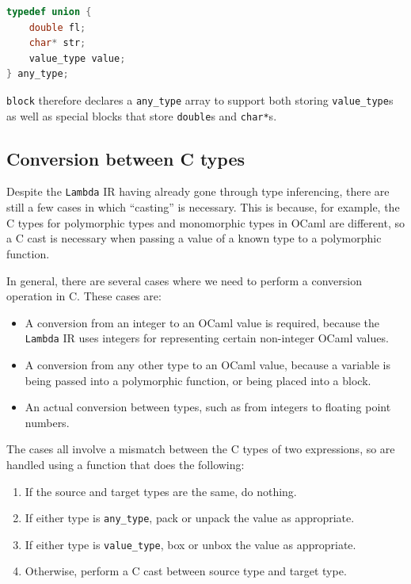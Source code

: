 \documentclass[12pt,a4paper,twoside,openright]{report}
\begin{document}
\begin{lstlisting}[language=C]
typedef union {
    double fl;
    char* str;
    value_type value;
} any_type;
\end{lstlisting}

\texttt{block} therefore declares a \verb|any_type| array to support both
storing \verb|value_type|s as well as special blocks that store \verb|double|s
and \verb|char*|s.

\subsection{Conversion between C types} \label{casting}

Despite the \texttt{Lambda} IR having already gone through type inferencing,
there are still a few cases in which ``casting'' is necessary. This is because,
for example, the C types for polymorphic types and monomorphic types in OCaml
are different, so a C cast is necessary when passing a value of a known type to
a polymorphic function.

In general, there are several cases where we need to perform a conversion
operation in C. These cases are: 

\begin{itemize}

\item A conversion from an integer to an OCaml value is required, because the
    \texttt{Lambda} IR uses integers for representing certain non-integer OCaml
    values.

\item A conversion from any other type to an OCaml value, because a variable is
    being passed into a polymorphic function, or being placed into a block.

\item An actual conversion between types, such as from integers to floating
    point numbers.

\end{itemize}

The cases all involve a mismatch between the C types of two expressions, so are
handled using a function that does the following:

\begin{enumerate}

\item If the source and target types are the same, do nothing.

\item If either type is \verb|any_type|, pack or unpack the value as
    appropriate. 

\item If either type is \verb|value_type|, box or unbox the value as
    appropriate.

\item Otherwise, perform a C cast between source type and target type.

\end{enumerate}
\end{document}
